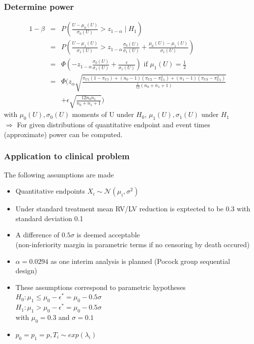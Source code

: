 \documentclass[xcolor=pdftex,dvipsnames,table]{beamer}\usepackage[]{graphicx}\usepackage[]{color}
\begin{document}
\begin{frame}[label = slide9] %
\frametitle{Determine power}
\begin{eqnarray*}
  1 - \beta & = & P(\frac{U - \mu_0(U)}{\sigma_0(U)}  > z_{1-\alpha} \mid H_1) \\
            & = & P \left(\frac{U - \mu_1(U)}{\sigma_1(U)}  > z_{1-\alpha}\frac{\sigma_0(U)}{\sigma_1(U)} + 
                    \frac{\mu_0(U) - \mu_1(U)}{\sigma_1(U)} \right) \\
            & = & \Phi\left(- z_{1-\alpha}\frac{\sigma_0(U)}{\sigma_1(U)} + \frac{\epsilon}{\sigma_1(U)}\right) \mbox{ if } \mu_1(U) = \frac{1}{2}\\
            & = & \Phi\bigg(z_{\alpha} \textstyle \sqrt{\frac{\pi_{U1} (1 - \pi_{U1}) + (n_0 - 1) (\pi_{U2} - \pi_{U1}^2) + (n_1 - 1) (\pi_{U3} - \pi_{U1}^2)}{\frac{1}{12}(n_0 + n_1 + 1)}}  \\
            &   & + \epsilon \textstyle \sqrt{\frac{12 n_0 n_1}{n_0 + n_1 + 1}}
            \bigg)
\end{eqnarray*}
with $\mu_0(U), \sigma_0(U)$ moments of U under $H_0$, $\mu_1(U), \sigma_1(U)$ under $H_1$\\
$\Rightarrow$ 
For given distributions of quantitative endpoint and event times (approximate) power can be computed.
\end{frame}

\begin{frame}[label = slide10] %
\frametitle{Application to clinical problem}
The following assumptions are made
\begin{itemize}
  \item Quantitative endpoints $X_i \sim \mathcal{N} ( \mu_i, \sigma^2 ) $
  \item Under standard treatment mean RV/LV reduction is exptected to be 0.3 with standard deviation 0.1
  \item A difference of $0.5 \sigma$ is deemed acceptable \\
        (non-inferiority margin in parametric terms if no censoring by death occured)
  \item $\alpha = 0.0294$ as one interim analysis is planned (Pocock group sequential design)
  \item These assumptions correspond to parametric hypotheses \\
        $H_0: \mu_1 \leq \mu_0 - \epsilon^{*}  = \mu_0 - 0.5 \sigma $\\
        $H_1: \mu_1 > \mu_0 - \epsilon^{*} = \mu_0 - 0.5 \sigma $ \\
        with $\mu_0 = 0.3$ and $\sigma = 0.1$
  \item $p_0 = p_1 = p, T_i \sim exp(\lambda_i)$
\end{itemize}
\end{frame}
\end{document}
